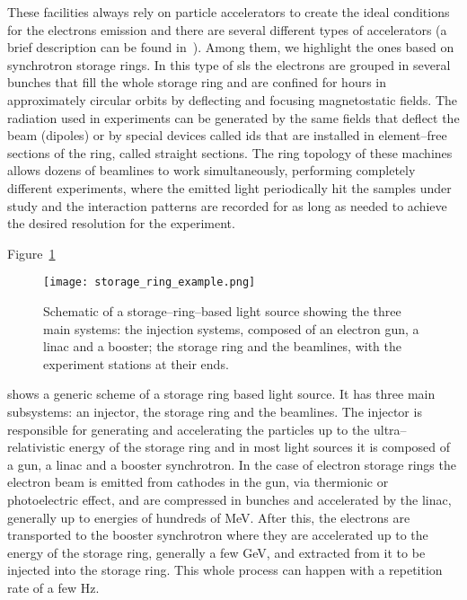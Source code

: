     These facilities always rely on particle accelerators to create the ideal conditions for the electrons emission and there are several different types of accelerators (a brief description can be found in~). Among them, we highlight the ones based on synchrotron storage rings. In this type of \gls{sls} the electrons are grouped in several bunches that fill the whole storage ring and are confined for hours in approximately circular orbits by deflecting and focusing magnetostatic fields. The radiation used in experiments can be generated by the same fields that deflect the beam (dipoles) or by special devices called \glspl{id} that are installed in element--free sections of the ring, called straight sections.
    The ring topology of these machines allows dozens of beamlines  to work simultaneously, performing completely different experiments, where the emitted light periodically hit the samples under study and the interaction patterns are recorded for as long as needed to achieve the desired resolution for the experiment.

    Figure~\ref{fig:light_source_example}
    \begin{figure}
        \center
        \texttt{[image: storage\_ring\_example.png]}
        \caption[Schematic of a storage--ring--based light source.]{Schematic of a storage--ring--based light source showing the three main systems: the injection systems, composed of an electron gun, a \gls{linac} and a booster; the storage ring and the beamlines, with the experiment stations at their ends.}
        \label{fig:light_source_example}
    \end{figure}
    shows a generic scheme of a storage ring based light source. It has three main subsystems: an injector, the storage ring and the beamlines. The injector is responsible for generating and accelerating the particles up to the ultra--relativistic energy of the storage ring and in most light sources it is composed of a gun, a \gls{linac} and a booster synchrotron. In the case of electron storage rings the electron beam is emitted from cathodes in the gun, via thermionic or photoelectric effect, and are compressed in bunches and accelerated by the \gls{linac}, generally up to energies of hundreds of \si{\mega\electronvolt}. After this, the electrons are transported to the booster synchrotron where they are accelerated up to the energy of the storage ring, generally a few \si{\giga\electronvolt}, and extracted from it to be injected into the storage ring. This whole process can happen with a repetition rate of a few \si{\hertz}.

